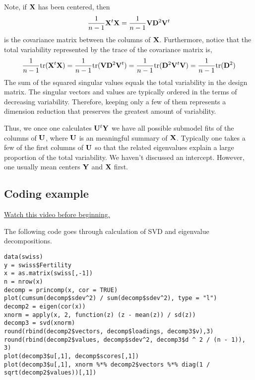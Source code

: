 Note, if $\mathbf{X}$ has been centered, then 
$$
\frac{1}{n-1} \mathbf{X}^t \mathbf{X} = \frac{1}{n-1} \mathbf{V} \mathbf{D}^2 \mathbf{V}^t
$$
is the covariance matrix between the columns of $\mathbf{X}$. Furthermore,
notice that the total variability represented by the trace of the covariance
matrix is, 
$$\frac{1}{n-1} \mbox{tr}(\mathbf{X}^t \mathbf{X})
= \frac{1}{n-1} \mbox{tr}(\mathbf{V} \mathbf{D}^2 \mathbf{V}^t)
=\frac{1}{n-1} \mbox{tr}(\mathbf{D}^2 \mathbf{V}^t \mathbf{V})
= \frac{1}{n-1} \mbox{tr}(\mathbf{D}^2)
$$
The sum of the squared singular values equals the total variability in the
design matrix. 
The singular
vectors and values are typically ordered in the terms of decreasing
variability. Therefore, keeping only a few of them represents a dimension
reduction that preserves the greatest amount of variability.

Thus, we once one calculates $\mathbf{U}^t \mathbf{Y}$ we have all possible submodel
fits of the columns of $\mathbf{U}$, where $\mathbf{U}$ is an meaningful summary
of $\mathbf{X}$. Typically one takes a few of the first columns of $\mathbf{U}$
so that the related eigenvalues explain a large proportion of the
total variability. We haven't discussed an intercept. However, 
one usually mean centers $\mathbf{Y}$ and $\mathbf{X}$ first.


\subsection{Coding example}

\href{https://www.youtube.com/watch?v=sC_NiEVKvn0&list=PLpl-gQkQivXhdgUCdaUQcdb31CRe8Mm2y&index=35}{Watch this video before beginning.}

The following code goes through calculation of SVD and eigenvalue 
decompositions.

\begin{verbatim}
data(swiss)
y = swiss$Fertility
x = as.matrix(swiss[,-1])
n = nrow(x)
decomp = princomp(x, cor = TRUE)
plot(cumsum(decomp$sdev^2) / sum(decomp$sdev^2), type = "l")
decomp2 = eigen(cor(x))
xnorm = apply(x, 2, function(z) (z - mean(z)) / sd(z))
decomp3 = svd(xnorm)
round(rbind(decomp2$vectors, decomp$loadings, decomp3$v),3)
round(rbind(decomp2$values, decomp$sdev^2, decomp3$d ^ 2 / (n - 1)), 3)
plot(decomp3$u[,1], decomp$scores[,1])
plot(decomp3$u[,1], xnorm %*% decomp2$vectors %*% diag(1 / sqrt(decomp2$values))[,1])
\end{verbatim}


